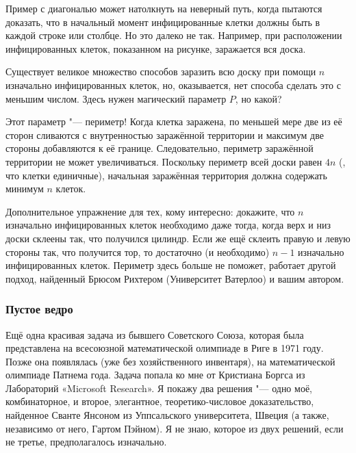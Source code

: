 \documentclass[twoside]{book}
\begin{document}
Пример с диагональю может натолкнуть на неверный путь, когда пытаются доказать, что в начальный момент инфицированные клетки должны быть в каждой строке или столбце.
Но это далеко не так.
Например, при расположении инфицированных клеток, показанном на рисунке, заражается вся доска.


Существует великое множество способов заразить всю доску при помощи $n$ изначально инфицированных клеток, но, оказывается, нет способа сделать это с меньшим числом.
Здесь нужен магический параметр $P$, но какой?

Этот параметр "--- периметр!
Когда клетка заражена, по меньшей мере две из её сторон сливаются с внутренностью заражённой территории и максимум две стороны добавляются к её границе.
Следовательно, периметр заражённой территории не может увеличиваться.
Поскольку периметр всей доски равен $4n$ (, что клетки единичные), начальная заражённая территория должна содержать минимум $n$ клеток.
\heart

Дополнительное упражнение для тех, кому интересно: докажите, что $n$ изначально инфицированных клеток необходимо даже тогда, когда верх и низ доски склеены так, что получился цилиндр.
Если же ещё склеить правую и левую стороны так, что получится тор, то достаточно (и необходимо) $n-1$ изначально инфицированных клеток.
Периметр здесь больше не поможет,
работает другой подход, найденный Брюсом Рихтером (Университет Ватерлоо) %
и вашим автором.

\subsubsection*{Пустое ведро}%

Ещё одна красивая задача из бывшего Советского Союза, которая была представлена на  всесоюзной математической олимпиаде в Риге в 1971 году.
Позже она появлялась (уже без хозяйственного инвентаря), на математической олимпиаде Патнема  года.
Задача попала ко мне от Кристиана Боргса из Лабораторий «Microsoft Research». %
Я покажу два решения "--- одно моё, комбинаторное, и второе, элегантное, теоретико-числовое доказательство, найденное Сванте Янсоном из Уппсальского университета, Швеция %
(а также, независимо от него, Гартом Пэйном). %
Я не знаю, которое из двух решений, если не третье, предполагалось изначально.
\end{document}
